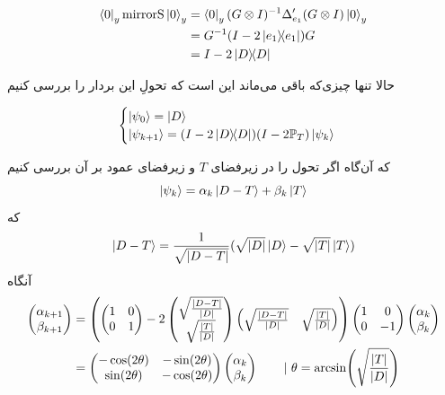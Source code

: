 \documentclass[a4paper,12pt]{article}
\begin{document}
\begin{align}
    \bra{0}_y \mathrm{mirrorS} \ket{0}_y &= \bra{0}_y (G \otimes I)^{-1} \Delta'_{e_1} (G \otimes I) \ket{0}_y \\ 
     &= G^{-1} (I - 2\dyad{e_1}) G \\
    &= I - 2\dyad{D}
\end{align}

حالا تنها چیزی‌که باقی می‌ماند این است که تحولِ این بردار را بررسی کنیم

\begin{equation}
\begin{cases}
    \ket{\psi_0} = \ket{D} \\
    \ket{\psi_{k+1}} = (I - 2\dyad{D})(I - 2\mathbb{P}_T) \ket{\psi_k}
\end{cases}
\end{equation}

که آن‌گاه اگر تحول را در زیرفضای $T$ و زیرفضای عمود بر آن بررسی کنیم
\begin{equation}
    \ket{\psi_k} = \alpha_k \ket{D - T} + \beta_k \ket{T}
\end{equation}
که
\begin{equation}
    \ket{D - T} = \frac{1}{\sqrt{\abs{D - T}}} (\sqrt{\abs{D}} \ket{D} - \sqrt{\abs{T}} \ket{T})
\end{equation}
آنگاه
\begin{align}
    \begin{pmatrix}
        \alpha_{k+1} \\ \beta_{k+1}
    \end{pmatrix} &=
    \left(\begin{pmatrix}
       1 & 0 \\
       0 & 1
    \end{pmatrix} -
    2\begin{pmatrix}
        \sqrt{\frac{\abs{D - T}}{\abs{D}}} \\
        \sqrt{\frac{\abs{T}}{\abs{D}}}
    \end{pmatrix} \begin{pmatrix}
        \sqrt{\frac{\abs{D - T}}{\abs{D}}} &
        \sqrt{\frac{\abs{T}}{\abs{D}}}
    \end{pmatrix}\right)
    \begin{pmatrix}
       1 & 0 \\
       0 & -1
    \end{pmatrix}
    \begin{pmatrix}
        \alpha_k \\ \beta_k
    \end{pmatrix} \\
    &= \begin{pmatrix}
        -\cos(2\theta) & -\sin(2\theta) \\
        \sin(2\theta) & -\cos(2\theta)
    \end{pmatrix}\begin{pmatrix}
        \alpha_k \\ \beta_k
    \end{pmatrix} \qquad | ~ \theta = \arcsin(\sqrt{\frac{\abs{T}}{\abs{D}}})
\end{align}
\end{document}
